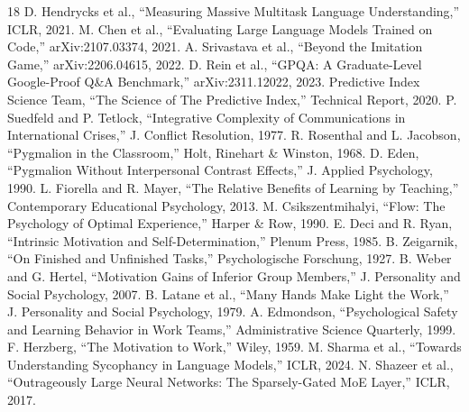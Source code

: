 \documentclass[conference]{IEEEtran}
\begin{document}
\begin{thebibliography}{18}
 D. Hendrycks et al., ``Measuring Massive Multitask Language Understanding,'' ICLR, 2021.
 M. Chen et al., ``Evaluating Large Language Models Trained on Code,'' arXiv:2107.03374, 2021.
 A. Srivastava et al., ``Beyond the Imitation Game,'' arXiv:2206.04615, 2022.
 D. Rein et al., ``GPQA: A Graduate-Level Google-Proof Q\&A Benchmark,'' arXiv:2311.12022, 2023.
 Predictive Index Science Team, ``The Science of The Predictive Index,'' Technical Report, 2020.
 P. Suedfeld and P. Tetlock, ``Integrative Complexity of Communications in International Crises,'' J. Conflict Resolution, 1977.
 R. Rosenthal and L. Jacobson, ``Pygmalion in the Classroom,'' Holt, Rinehart \& Winston, 1968.
 D. Eden, ``Pygmalion Without Interpersonal Contrast Effects,'' J. Applied Psychology, 1990.
 L. Fiorella and R. Mayer, ``The Relative Benefits of Learning by Teaching,'' Contemporary Educational Psychology, 2013.
 M. Csikszentmihalyi, ``Flow: The Psychology of Optimal Experience,'' Harper \& Row, 1990.
 E. Deci and R. Ryan, ``Intrinsic Motivation and Self-Determination,'' Plenum Press, 1985.
 B. Zeigarnik, ``On Finished and Unfinished Tasks,'' Psychologische Forschung, 1927.
 B. Weber and G. Hertel, ``Motivation Gains of Inferior Group Members,'' J. Personality and Social Psychology, 2007.
 B. Latane et al., ``Many Hands Make Light the Work,'' J. Personality and Social Psychology, 1979.
 A. Edmondson, ``Psychological Safety and Learning Behavior in Work Teams,'' Administrative Science Quarterly, 1999.
 F. Herzberg, ``The Motivation to Work,'' Wiley, 1959.
 M. Sharma et al., ``Towards Understanding Sycophancy in Language Models,'' ICLR, 2024.
 N. Shazeer et al., ``Outrageously Large Neural Networks: The Sparsely-Gated MoE Layer,'' ICLR, 2017.
\end{thebibliography}
\end{document}
